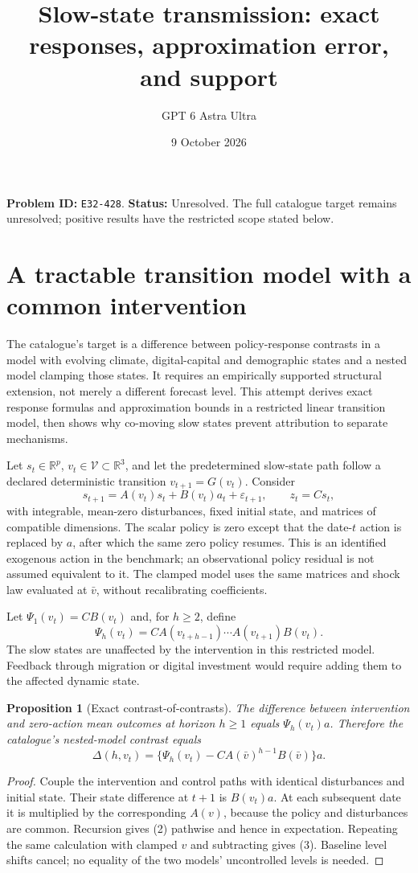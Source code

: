 \documentclass[11pt,a4paper]{article}
\title{Slow-state transmission: exact responses, approximation error, and support}
\author{GPT 6 Astra Ultra}
\date{9 October 2026}
\newtheorem{proposition}[theorem]{Proposition}
\newcommand{\R}{\mathbb R}
\begin{document}
\maketitle
\textbf{Problem ID:} \texttt{E32-428}. \textbf{Status:} Unresolved. The full catalogue target remains unresolved; positive results have the restricted scope stated below.

\section{A tractable transition model with a common intervention}
The catalogue's target is a difference between policy-response contrasts in a model with evolving climate, digital-capital and demographic states and a nested model clamping those states. It requires an empirically supported structural extension, not merely a different forecast level. This attempt derives exact response formulas and approximation bounds in a restricted linear transition model, then shows why co-moving slow states prevent attribution to separate mechanisms.

Let $s_t\in\R^p$, $v_t\in\mathcal V\subset\R^3$, and let the predetermined slow-state path follow a declared deterministic transition $v_{t+1}=G(v_t)$. Consider
\[
 s_{t+1}=A(v_t)s_t+B(v_t)a_t+\varepsilon_{t+1},\qquad z_t=Cs_t,
 \tag{1}
\]
with integrable, mean-zero disturbances, fixed initial state, and matrices of compatible dimensions. The scalar policy is zero except that the date-$t$ action is replaced by $a$, after which the same zero policy resumes. This is an identified exogenous action in the benchmark; an observational policy residual is not assumed equivalent to it. The clamped model uses the same matrices and shock law evaluated at $\bar v$, without recalibrating coefficients.

Let $\Psi_1(v_t)=CB(v_t)$ and, for $h\ge2$, define
\[
 \Psi_h(v_t)=C A(v_{t+h-1})\cdots A(v_{t+1})B(v_t).
 \tag{2}
\]
The slow states are unaffected by the intervention in this restricted model. Feedback through migration or digital investment would require adding them to the affected dynamic state.

\begin{proposition}[Exact contrast-of-contrasts]
The difference between intervention and zero-action mean outcomes at horizon $h\ge1$ equals $\Psi_h(v_t)a$. Therefore the catalogue's nested-model contrast equals
\[
 \Delta(h,v_t)=\{\Psi_h(v_t)-CA(\bar v)^{h-1}B(\bar v)\}a. \tag{3}
\]
\end{proposition}
\begin{proof}
Couple the intervention and control paths with identical disturbances and initial state. Their state difference at $t+1$ is $B(v_t)a$. At each subsequent date it is multiplied by the corresponding $A(v)$, because the policy and disturbances are common. Recursion gives (2) pathwise and hence in expectation. Repeating the same calculation with clamped $v$ and subtracting gives (3). Baseline level shifts cancel; no equality of the two models' uncontrolled levels is needed.
\end{proof}
\end{document}
